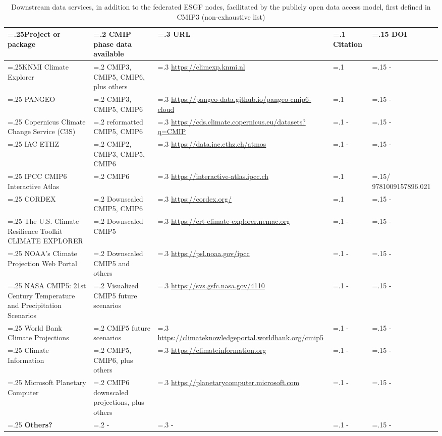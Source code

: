 \documentclass[manuscript]{copernicus}
\def\cred#1{{\color{red}#1}}
\begin{document}
\begin{table}[htp]
\renewcommand{\arraystretch}{2}
\scriptsize
\centering
\caption{Downstream data services, in addition to the federated ESGF nodes, facilitated by the publicly open data access model, first defined in CMIP3 (non-exhaustive list)}
\resizebox{\textwidth}{!} {
	\begin{tabularx}{0.9\textwidth} { 
	  | >{\raggedright\arraybackslash\hsize=.25\hsize}X
	  | >{\centering\arraybackslash\hsize=.2\hsize}X
	  | >{\centering\arraybackslash\hsize=.3\hsize}X
	  | >{\centering\arraybackslash\hsize=.1\hsize}X
	  | >{\centering\arraybackslash\hsize=.15\hsize}X | }
\hline
\textbf{Project or package} & \textbf{CMIP phase data available} & \textbf{URL} & \textbf{Citation} & \textbf{DOI}\\ \hline
KNMI Climate Explorer & CMIP3, CMIP5, CMIP6, plus others & \url{https://climexp.knmi.nl} & \cite{trouet_knmi_2013} & - \\ \hline
PANGEO & CMIP3, CMIP5, CMIP6 & \url{https://pangeo-data.github.io/pangeo-cmip6-cloud} & \cite{abernathey_cmip6_2020} & - \\ \hline
Copernicus Climate Change Service (C3S) & reformatted CMIP5, CMIP6 & \url{https://cds.climate.copernicus.eu/datasets?q=CMIP} & - & - \\ \hline
IAC ETHZ & CMIP2, CMIP3, CMIP5, CMIP6 & \url{https://data.iac.ethz.ch/atmos} & - & - \\ \hline
IPCC CMIP6 Interactive Atlas & CMIP6 & \url{https://interactive-atlas.ipcc.ch} & \cite{gutierrez_atlas_2021} & 10.1017/ 9781009157896.021 \\ \hline
CORDEX &  Downscaled CMIP5, CMIP6 & \url{https://cordex.org/} & \cite{jones_coordinated_2011,gutowski_jr_wcrp_2016} & - \\ \hline
The U.S. Climate Resilience Toolkit CLIMATE EXPLORER & Downscaled CMIP5 & \url{https://crt-climate-explorer.nemac.org} & - & - \\ \hline
NOAA’s Climate Projection Web Portal & Downscaled CMIP5 and others & \url{https://psl.noaa.gov/ipcc} & - & - \\ \hline
NASA CMIP5: 21st Century Temperature and Precipitation Scenarios & Visualized CMIP5 future scenarios & \url{https://svs.gsfc.nasa.gov/4110} & - & - \\ \hline
World Bank Climate Projections & CMIP5 future scenarios & \url{https://climateknowledgeportal.worldbank.org/cmip5} & - & - \\ \hline
Climate Information & CMIP5, CMIP6, plus others & \url{https://climateinformation.org} & - & - \\ \hline
Microsoft Planetary Computer & CMIP6 downscaled projections, plus others & \url{https://planetarycomputer.microsoft.com} & - & - \\ \hline
\cred{\textbf{Others?}} & - & - & - & - \\ \hline
\end{tabularx}
} %
\label{tab:secAppE1-CMIP6DownstreamServices}
\footnotesize{}
\end{table}
\end{document}
